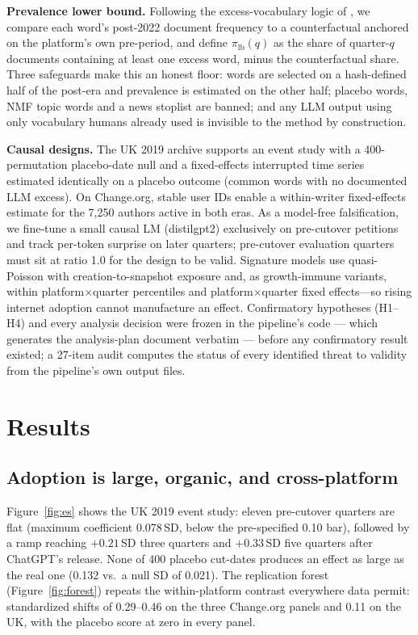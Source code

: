 \documentclass[10pt,twocolumn]{article}
\begin{document}
\textbf{Prevalence lower bound.} Following the excess-vocabulary logic of \cite{kobak2025delving}, we compare each word's post-2022 document frequency to a counterfactual anchored on the platform's own pre-period, and define $\pi_{\mathrm{lb}}(q)$ as the share of quarter-$q$ documents containing at least one excess word, minus the counterfactual share. Three safeguards make this an honest floor: words are selected on a hash-defined half of the post-era and prevalence is estimated on the other half; placebo words, NMF topic words and a news stoplist are banned; and any LLM output using only vocabulary humans already used is invisible to the method by construction.

\textbf{Causal designs.} The UK 2019 archive supports an event study with a 400-permutation placebo-date null and a fixed-effects interrupted time series estimated identically on a placebo outcome (common words with no documented LLM excess). On Change.org, stable user IDs enable a within-writer fixed-effects estimate for the 7{,}250 authors active in both eras. As a model-free falsification, we fine-tune a small causal LM (distilgpt2) exclusively on pre-cutover petitions and track per-token surprise on later quarters; pre-cutover evaluation quarters must sit at ratio 1.0 for the design to be valid. Signature models use quasi-Poisson with creation-to-snapshot exposure and, as growth-immune variants, within platform$\times$quarter percentiles and platform$\times$quarter fixed effects---so rising internet adoption cannot manufacture an effect. Confirmatory hypotheses (H1--H4) and every analysis decision were frozen in the pipeline's code --- which generates the analysis-plan document verbatim --- before any confirmatory result existed; a 27-item audit computes the status of every identified threat to validity from the pipeline's own output files.

\section{Results}
\subsection{Adoption is large, organic, and cross-platform}
Figure~\ref{fig:es} shows the UK 2019 event study: eleven pre-cutover quarters are flat (maximum coefficient 0.078\,SD, below the pre-specified 0.10 bar), followed by a ramp reaching $+0.21$\,SD three quarters and $+0.33$\,SD five quarters after ChatGPT's release. None of 400 placebo cut-dates produces an effect as large as the real one (0.132 vs.\ a null SD of 0.021). The replication forest (Figure~\ref{fig:forest}) repeats the within-platform contrast everywhere data permit: standardized shifts of 0.29--0.46 on the three Change.org panels and 0.11 on the UK, with the placebo score at zero in every panel.
\end{document}
